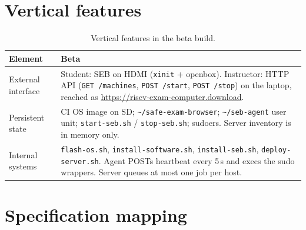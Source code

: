 \documentclass[11pt]{article}
\begin{document}
\section{Vertical features}

\begin{table}[H]
  \centering
  \footnotesize
  \setlength{\tabcolsep}{3pt}
  \begin{tabularx}{\textwidth}{@{}p{}X@{}}
    \toprule
    \textbf{Element} & \textbf{Beta} \\
    \midrule
    External interface &
    Student: SEB on HDMI (\texttt{xinit} + openbox). Instructor: HTTP API (\texttt{GET /machines}, \texttt{POST /start}, \texttt{POST /stop}) on the laptop, reached as \url{https://riscv-exam-computer.download}. \\
    Persistent state &
    CI OS image on SD; \texttt{\~{}/safe-exam-browser}; \texttt{\~{}/seb-agent} user unit; \texttt{start-seb.sh} / \texttt{stop-seb.sh}; sudoers. Server inventory is in memory only. \\
    Internal systems &
    \texttt{flash-os.sh}, \texttt{install-software.sh}, \texttt{install-seb.sh}, \texttt{deploy-server.sh}. Agent POSTs heartbeat every 5\,s and execs the sudo wrappers. Server queues at most one job per host. \\
    \bottomrule
  \end{tabularx}
  \caption{Vertical features in the beta build.}
  \label{tab:vertical}
\end{table}

\section{Specification mapping}
\end{document}
